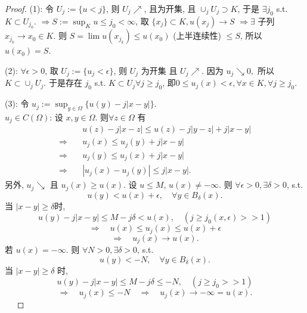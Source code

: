 \begin{proof}
    (1): 令 $U_{j}:=\{u <j\}$, 则 $U_j \nearrow$,  且为开集, 且 $\cup _{j}U_j \supset K$,
    于是 $\exists j_0$ s.t. $K \subset U_{j_0}$. $\Rightarrow S:=\sup_K u \leq j_0<\infty $, 取 $\{x_j\} \subset K, u(x_j) \to S$ $\Rightarrow \exists $ 子列 $x_{j_k} \to x_0 \in K$.
    则 $S=\lim u(x_{j_k}) \leq u(x_0)$ (上半连续性) $\leq S$, 所以 $u(x_0)=S$.   
    
    (2): $\forall \epsilon >0$, 取 $U_j:=\{u_j <\epsilon \}$, 则 $U_j$ 为开集 且 $U_j \nearrow$. 因为 $u_j \searrow 0,$ 所以 $K \subset \cup _j U_j$. 于是存在 $j_0$ s.t. $K \subset U_{j} \forall j \geq j_0$, 即$0 \leq u_j(x) <\epsilon, \forall x \in K, \forall j \geq j_0 $. 
    
    (3): 令 $u_j:=\sup_{y \in \Omega } \{u(y)-j |x-y|\}$. \\
    $u_j \in C(\Omega )$:  设 $x,y \in \Omega .$ 则$ \forall z \in \Omega $ 有 
    $$ \begin{aligned}
       & u(z)-j|x-z| \leq u(z)-j |y-z|+j |x-y| \\
       \Rightarrow \quad & u_{j}(x) \leq u_j (y)+j |x-y| \\
       \Rightarrow \quad & u_{j}(y) \leq u_j (x)+j |x-y| \\
       \Rightarrow \quad& | u_j(x)-u_j(y) | \leq j|x-y|.
    \end{aligned}  $$
  另外, $u_j \searrow $ 且 $u_j(x) \geq u(x)$. 设 $u \leq M$, $u(x) \neq -\infty $. 则 $\forall \epsilon >0, \exists \delta >0$, s.t. 
  $$ u(y)<u(x)+\epsilon , \quad \forall y \in B_{\delta }(x). $$     
  当 $|x-y| \geq \delta $时, 
  $$ u(y)-j|x-y| \leq M-j \delta  < u(x), \quad (j \geq j_0(x,\epsilon )>>1) $$
  $$ \Rightarrow \quad u(x) \leq u_j(x) \leq u(x)+\epsilon  $$
   $$ \Rightarrow \quad u_j (x) \to u(x).$$
若 $u(x)=-\infty $. 则 $\forall N>0, \exists \delta >0$, s.t. 
$$ u(y)<-N, \quad \forall y \in B_{\delta }(x). $$  
当 $|x-y| \geq \delta $ 时, 
$$ u(y)-j|x-y| \leq M -j \delta  \leq -N, \quad (j \geq j_0>>1) $$
$$\Rightarrow \quad u_j(x ) \leq -N  \quad \Rightarrow \quad u_j(x) \to -\infty =u(x).$$
~~
\end{proof}

